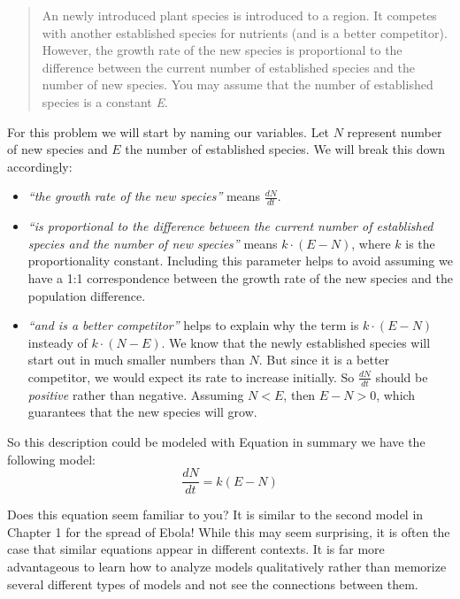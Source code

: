 \documentclass[
]{book}
\providecommand{\tightlist}{%
  \setlength{\itemsep}{0pt}\setlength{\parskip}{0pt}}
\theoremstyle{definition}
\theoremstyle{definition}
\theoremstyle{definition}
\theoremstyle{remark}
\begin{document}
\begin{quote}
An newly introduced plant species is introduced to a region. It competes with another established species for nutrients (and is a better competitor). However, the growth rate of the new species is proportional to the difference between the current number of established species and the number of new species. You may assume that the number of established species is a constant \emph{E}.
\end{quote}

For this problem we will start by naming our variables. Let \(N\) represent number of new species and \(E\) the number of established species. We will break this down accordingly:

\begin{itemize}
\tightlist
\item
  \emph{``the growth rate of the new species''} means \(\displaystyle \frac{dN}{dt}\).
\item
  \emph{``is proportional to the difference between the current number of established species and the number of new species''} means \(\displaystyle k \cdot (E-N)\), where \(k\) is the proportionality constant. Including this parameter helps to avoid assuming we have a 1:1 correspondence between the growth rate of the new species and the population difference.
\item
  \emph{``and is a better competitor''} helps to explain why the term is \(\displaystyle k \cdot (E-N)\) insteady of \(\displaystyle k \cdot (N-E)\). We know that the newly established species will start out in much smaller numbers than \(N\). But since it is a better competitor, we would expect its rate to increase initially. So \(\displaystyle \frac{dN}{dt}\) should be \emph{positive} rather than negative. Assuming \(N < E\), then \(E-N > 0\), which guarantees that the new species will grow.
\end{itemize}

So this description could be modeled with Equation in summary we have the following model:
\begin{equation}
\frac{dN}{dt} = k(E-N)
\end{equation}

Does this equation seem familiar to you? It is similar to the second model in Chapter 1 for the spread of Ebola! While this may seem surprising, it is often the case that similar equations appear in different contexts. It is far more advantageous to learn how to analyze models qualitatively rather than memorize several different types of models and not see the connections between them.
\end{document}
